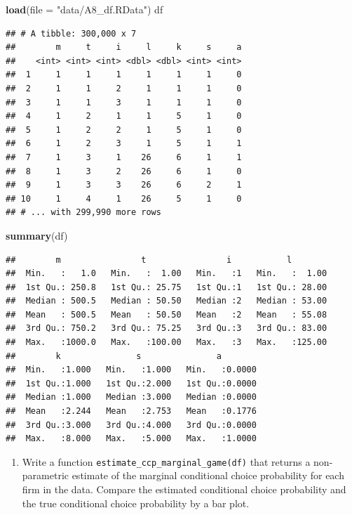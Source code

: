 \documentclass[]{book}
\newenvironment{Shaded}{\begin{snugshade}}{\end{snugshade}}
\newcommand{\KeywordTok}[1]{\textcolor[rgb]{0.13,0.29,0.53}{\textbf{#1}}}
\newcommand{\DataTypeTok}[1]{\textcolor[rgb]{0.13,0.29,0.53}{#1}}
\newcommand{\StringTok}[1]{\textcolor[rgb]{0.31,0.60,0.02}{#1}}
\newcommand{\NormalTok}[1]{#1}
\providecommand{\tightlist}{%
  \setlength{\itemsep}{0pt}\setlength{\parskip}{0pt}}
\begin{document}
\begin{Shaded}
\begin{Highlighting}[]
\KeywordTok{load}\NormalTok{(}\DataTypeTok{file =} \StringTok{"data/A8_df.RData"}\NormalTok{)}
\NormalTok{df}
\end{Highlighting}
\end{Shaded}

\begin{verbatim}
## # A tibble: 300,000 x 7
##        m     t     i     l     k     s     a
##    <int> <int> <int> <dbl> <dbl> <int> <int>
##  1     1     1     1     1     1     1     0
##  2     1     1     2     1     1     1     0
##  3     1     1     3     1     1     1     0
##  4     1     2     1     1     5     1     0
##  5     1     2     2     1     5     1     0
##  6     1     2     3     1     5     1     1
##  7     1     3     1    26     6     1     1
##  8     1     3     2    26     6     1     0
##  9     1     3     3    26     6     2     1
## 10     1     4     1    26     5     1     0
## # ... with 299,990 more rows
\end{verbatim}

\begin{Shaded}
\begin{Highlighting}[]
\KeywordTok{summary}\NormalTok{(df)}
\end{Highlighting}
\end{Shaded}

\begin{verbatim}
##        m                t                i           l         
##  Min.   :   1.0   Min.   :  1.00   Min.   :1   Min.   :  1.00  
##  1st Qu.: 250.8   1st Qu.: 25.75   1st Qu.:1   1st Qu.: 28.00  
##  Median : 500.5   Median : 50.50   Median :2   Median : 53.00  
##  Mean   : 500.5   Mean   : 50.50   Mean   :2   Mean   : 55.08  
##  3rd Qu.: 750.2   3rd Qu.: 75.25   3rd Qu.:3   3rd Qu.: 83.00  
##  Max.   :1000.0   Max.   :100.00   Max.   :3   Max.   :125.00  
##        k               s               a         
##  Min.   :1.000   Min.   :1.000   Min.   :0.0000  
##  1st Qu.:1.000   1st Qu.:2.000   1st Qu.:0.0000  
##  Median :1.000   Median :3.000   Median :0.0000  
##  Mean   :2.244   Mean   :2.753   Mean   :0.1776  
##  3rd Qu.:3.000   3rd Qu.:4.000   3rd Qu.:0.0000  
##  Max.   :8.000   Max.   :5.000   Max.   :1.0000
\end{verbatim}

\begin{enumerate}
\def\labelenumi{\arabic{enumi}.}
\setcounter{enumi}{13}
\tightlist
\item
  Write a function \texttt{estimate\_ccp\_marginal\_game(df)} that
  returns a non-parametric estimate of the marginal conditional choice
  probability for each firm in the data. Compare the estimated
  conditional choice probability and the true conditional choice
  probability by a bar plot.
\end{enumerate}
\end{document}
